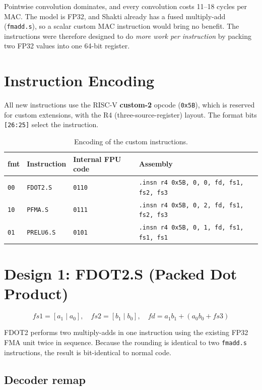 Pointwise convolution dominates, and every convolution costs 11--18 cycles
per MAC. The model is FP32, and Shakti already has a fused multiply-add
(\texttt{fmadd.s}), so a scalar custom MAC instruction would bring no
benefit. The instructions were therefore designed to do \emph{more work per
instruction} by packing two FP32 values into one 64-bit register.

\section{Instruction Encoding}

All new instructions use the RISC-V \textbf{custom-2} opcode
(\texttt{0x5B}), which is reserved for custom extensions, with the R4
(three-source-register) layout. The format bits \texttt{[26:25]} select the
instruction.

\begin{table}[h]
\centering
\begin{tabular}{llll}\toprule
fmt & Instruction & Internal FPU code & Assembly\\\midrule
\texttt{00} & \texttt{FDOT2.S}  & \texttt{0110} & \texttt{.insn r4 0x5B, 0, 0, fd, fs1, fs2, fs3}\\
\texttt{10} & \texttt{PFMA.S}   & \texttt{0111} & \texttt{.insn r4 0x5B, 0, 2, fd, fs1, fs2, fs3}\\
\texttt{01} & \texttt{PRELU6.S} & \texttt{0101} & \texttt{.insn r4 0x5B, 0, 1, fd, fs1, fs1, fs1}\\\bottomrule
\end{tabular}
\caption{Encoding of the custom instructions.}
\end{table}

\section{Design 1: FDOT2.S (Packed Dot Product)}

\[
fs1 = [a_1 \mid a_0],\quad fs2 = [b_1 \mid b_0],\quad
fd = a_1 b_1 + (a_0 b_0 + fs3)
\]

FDOT2 performs two multiply-adds in one instruction using the existing FP32
FMA unit twice in sequence. Because the rounding is identical to two
\texttt{fmadd.s} instructions, the result is bit-identical to normal code.

\subsection{Decoder remap}

